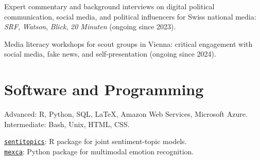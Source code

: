 \documentclass[11pt,a4paper]{article}
\begin{document}
Expert commentary and background interviews on digital political communication, social media, and political influencers for Swiss national media: \textit{SRF}, \textit{Watson}, \textit{Blick}, \textit{20 Minuten} (ongoing since 2023).

Media literacy workshops for scout groups in Vienna: critical engagement with social media, fake news, and self-presentation (ongoing since 2024).


\section{Software and Programming}

Advanced: R, Python, SQL, \LaTeX, Amazon Web Services, Microsoft Azure.\\
Intermediate: Bash, Unix, HTML, CSS.

\href{https://github.com/cpipal/sentitopics}{\texttt{sentitopics}}: R package for joint sentiment-topic models.\\
\href{https://github.com/mexca/mexca}{\texttt{mexca}}: Python package for multimodal emotion recognition.
\end{document}
